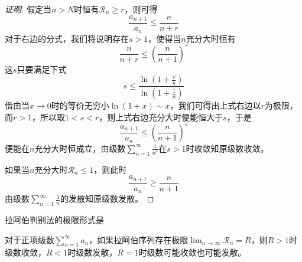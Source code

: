 \begin{proof}[证明]
  假定当$n>N$时恒有$\mathcal{R}_n \geqslant r$，则可得
  \[ \frac{a_{n+1}}{a_n} \leqslant \frac{n}{n+r} \]
  对于右边的分式，我们将说明存在$s>1$，使得当$n$充分大时恒有
  \[ \frac{n}{n+r} \leqslant \left( \frac{n}{n+1} \right)^s \]
  这$s$只要满足下式
  \[ s \leqslant \frac{\ln{\left( 1+\frac{r}{n} \right)}}{\ln{\left( 1+\frac{1}{n} \right)}} \]
  借由当$x \to 0$时的等价无穷小$\ln(1+x) \sim x$，我们可得出上式右边以$r$为极限，而$r>1$，所以取$1<s<r$，则上式右边充分大时便能恒大于$s$，于是
  \[ \frac{a_{n+1}}{a_n} \leqslant \left( \frac{n}{n+1} \right)^s \]
  便能在$n$充分大时恒成立，由级数$\sum_{n=1}^{\infty}\frac{1}{n^s}$在$s>1$时收敛知原级数收敛。

  如果当$n$充分大时$\mathcal{R}_n \leqslant 1$，则此时
  \[ \frac{a_{n+1}}{a_n} \geqslant \frac{n}{n+1} \]
  由级数$\sum_{n=1}^{\infty}\frac{1}{n}$的发散知原级数发散。
\end{proof}

拉阿伯判别法的极限形式是
\begin{inference}
  对于正项级数$\sum_{n=1}^{\infty}a_n$，如果拉阿伯序列存在极限$\lim_{n \to \infty} \mathcal{R}_n=R$，则$R>1$时级数收敛，$R<1$时级数发散，$R=1$时级数可能收敛也可能发散。
\end{inference}


